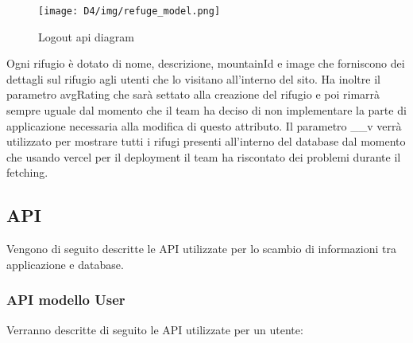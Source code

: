 \documentclass[a4paper,12pt]{article}
\begin{document}
    \begin{figure}[H]
    \centering
    \texttt{[image: D4/img/refuge\_model.png]}
    \caption{Logout api diagram}
    \end{figure}

Ogni rifugio è dotato di nome, descrizione, mountainId e image che forniscono dei dettagli sul rifugio agli utenti che lo visitano all'interno del sito. \newline
Ha inoltre il parametro avgRating che sarà settato alla creazione del rifugio e poi rimarrà sempre uguale dal momento che il team ha deciso di non implementare la parte di applicazione necessaria alla modifica di questo attributo. \newline
Il parametro \_\_v verrà utilizzato per mostrare tutti i rifugi presenti all'interno del database dal momento che usando vercel per il deployment il team ha riscontato dei problemi durante il fetching.

\newpage
\subsection{API}
Vengono di seguito descritte le API utilizzate per lo scambio di informazioni tra applicazione e database.

\subsubsection{API modello User}
Verranno descritte di seguito le API utilizzate per un utente:
\end{document}

